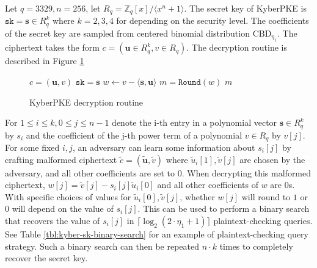 \documentclass[runningheads]{llncs}
\begin{document}
Let $q=3329, n=256$, let $R_q = \mathbb{Z}_q[x] / \langle x^n + 1 \rangle$. The secret key of KyberPKE is $\texttt{sk} = \mathbf{s} \in R_q^k$ where $k = 2, 3, 4$ for depending on the security level. The coefficients of the secret key are sampled from centered binomial distribution $\text{CBD}_{\eta_1}$. The ciphertext takes the form $c = (\mathbf{u}\in R_q^k, v \in R_q)$. The decryption routine is described in Figure \ref{fig:kyberpke-decryption}

\begin{figure}[H]
    \centering

    \begin{minipage}[t]{0.5\textwidth}
        \begin{algorithm}[H]
            \caption*{$\texttt{KyberPKE.Dec}(\texttt{sk}, c)$}
            \begin{algorithmic}[1]
                \Require $c = (\mathbf{u}, v)$
                \Require $\texttt{sk} = \mathbf{s}$
                \State $w \leftarrow v - \langle \mathbf{s}, \mathbf{u} \rangle$
                \State $m = \texttt{Round}(w)$
                \State \Return $m$
            \end{algorithmic}
        \end{algorithm}
    \end{minipage}
    \caption{KyberPKE decryption routine}\label{fig:kyberpke-decryption}
\end{figure}

For $1\leq i \leq k, 0 \leq j \leq n-1$ denote the i-th entry in a polynomial vector $\mathbf{s} \in R_q^k$ by $s_i$ and the coefficient of the j-th power term of a polynomial $v \in R_q$ by $v[j]$. For some fixed $i, j$, an adversary can learn some information about $s_{i}[j]$ by crafting malformed ciphertext $\tilde{c} = (\tilde{\mathbf{u}}, \tilde{v})$ where $\tilde{u}_{i}[1], \tilde{v}[j]$ are chosen by the adversary, and all other coefficients are set to 0. When decrypting this malformed ciphertext, $w[j] = \tilde{v}[j] - s_i[j]\tilde{u}_i[0]$ and all other coefficients of $w$ are 0s. With specific choices of values for $\tilde{u}_i[0], \tilde{v}[j]$, whether $w[j]$ will round to $1$ or $0$ will depend on the value of $s_i[j]$. This can be used to perform a binary search that recovers the value of $s_i[j]$ in $\lceil\log_2(2\cdot\eta_1 + 1)\rceil$ plaintext-checking queries. See Table \ref{tbl:kyber-sk-binary-search} for an example of plaintext-checking query strategy. Such a binary search can then be repeated $n \cdot k$ times to completely recover the secret key.
\end{document}
